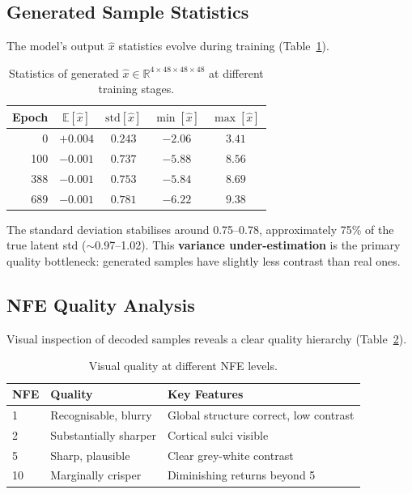 \documentclass[11pt,a4paper]{article}
\begin{document}
\subsection{Generated Sample Statistics}

The model's output $\hat{x}$ statistics evolve during training
(Table~\ref{tab:xhat}).

\begin{table}[ht]
\centering
\caption{Statistics of generated $\hat{x} \in \mathbb{R}^{4 \times 48 \times 48 \times 48}$ at different training stages.}
\label{tab:xhat}
\begin{tabular}{rcccc}
\toprule
\textbf{Epoch} & $\mathbb{E}[\hat{x}]$ & $\mathrm{std}[\hat{x}]$ & $\min[\hat{x}]$ & $\max[\hat{x}]$ \\
\midrule
0   & $+0.004$ & $0.243$ & $-2.06$ & $3.41$ \\
100 & $-0.001$ & $0.737$ & $-5.88$ & $8.56$ \\
388 & $-0.001$ & $0.753$ & $-5.84$ & $8.69$ \\
689 & $-0.001$ & $0.781$ & $-6.22$ & $9.38$ \\
\bottomrule
\end{tabular}
\end{table}

The standard deviation stabilises around 0.75--0.78, approximately 75\% of the
true latent std (${\sim}$0.97--1.02).  This \textbf{variance under-estimation}
is the primary quality bottleneck: generated samples have slightly less contrast
than real ones.

\subsection{NFE Quality Analysis}

Visual inspection of decoded samples reveals a clear quality hierarchy
(Table~\ref{tab:nfe_quality}).

\begin{table}[ht]
\centering
\caption{Visual quality at different NFE levels.}
\label{tab:nfe_quality}
\begin{tabular}{lll}
\toprule
\textbf{NFE} & \textbf{Quality} & \textbf{Key Features} \\
\midrule
1  & Recognisable, blurry    & Global structure correct, low contrast \\
2  & Substantially sharper   & Cortical sulci visible \\
5  & Sharp, plausible        & Clear grey-white contrast \\
10 & Marginally crisper      & Diminishing returns beyond 5 \\
\bottomrule
\end{tabular}
\end{table}
\end{document}
